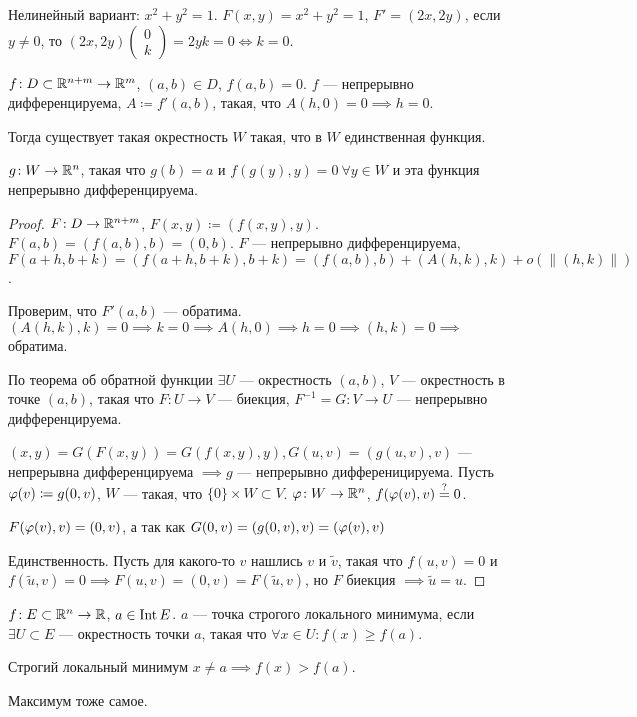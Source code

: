 Нелинейный вариант: $x^2 + y^2 = 1$.  $F(x, y) = x^2+y^2=1$,  $F'=(2x,2y)$, если  $y \neq 0$, то $(2x,2y) \begin{pmatrix} 0 \\ k \end{pmatrix}  = 2yk = 0 \iff k = 0$.
\begin{theorem}
    $f\!: D \subset \mathbb{R}^{n+m} \to \mathbb{R}^m$,  $(a, b) \in D$, $f(a, b) = 0$.  $f$ --- непрерывно дифференцируема,  $A \coloneqq f'(a, b)$, такая, что  $A(h, 0) = 0 \implies h = 0$.

    Тогда существует такая окрестность $W$ такая, что в  $W$ единственная функция.

     $g\!: W \to \mathbb{R}^n$, такая что  $g(b) = a$ и  $f(g(y), y) = 0\ \forall y \in W$ и эта функция непрерывно дифференцируема. 
\end{theorem}
\begin{proof}
    $F\!: D \to \mathbb{R}^{n+m}$,  $F(x, y) \coloneqq (f(x, y), y)$.  $F(a, b) = (f(a, b), b) = (0, b)$.  $F$ --- непрерывно дифференцируема,  $F(a+h, b+k) = (f(a+h, b+k), b+k) = (f(a, b), b) + (A(h, k), k) + o(\|(h, k)\|)$.

    Проверим, что $F'(a, b)$ --- обратима.  $(A(h, k), k) = 0 \implies k = 0 \implies A(h, 0) \implies h = 0 \implies (h, k) = 0 \implies$ обратима.

    По теорема об обратной функции  $\exists U$ --- окрестность  $(a, b)$,  $V$ --- окрестность в точке  $(a, b)$, такая что  $F\!: U \to V$ --- биекция,  $F^{-1} = G\!: V \to U$ --- непрерывно дифференцируема.

    $(x, y) = G(F(x, y)) = G(f(x, y), y), G(u, v) = (g(u, v), v)$ --- непрерывна дифференцируема $\implies g$ --- непрерывно дифференицируема. Пусть  $\varphi(v) \coloneqq g(0, v)$,  $W$ --- такая, что  $\{0\}\times W \subset V$.  $\varphi\!: W \to \mathbb{R}^n$,  $f(\varphi(v), v) \overset{?}{=} 0$. 

     $F(\varphi(v), v) = (0, v)$, а так как  $G(0, v) = (g(0, v), v) = (\varphi(v), v)$

     Единственность. Пусть для какого-то $v$ нашлись  $v$ и  $\widetilde{v}$, такая что  $f(u, v) = 0$ и  $f(\widetilde{u}, v) = 0 \implies F(u, v) = (0, v) = F(\widetilde{u}, v)$, но  $F$ биекция $\implies \widetilde{u} = u$.
\end{proof}
\begin{definition}
    $f\!: E \subset \mathbb{R}^n \to \mathbb{R}$,  $a \in \operatorname{Int} E$.  $a$ --- точка строгого локального минимума, если  $\exists U \subset E$ --- окрестность точки  $a$, такая что  $\forall x \in U\!: f(x) \ge f(a)$.

    Строгий локальный минимум $x \neq a \implies f(x) > f(a)$.

    Максимум тоже самое.
\end{definition}
